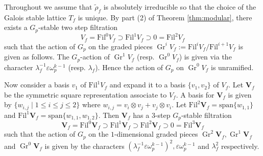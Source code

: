 \documentclass{amsart}
\renewcommand{\leq}{\leqslant}
\newcommand{\Fil}{\mathrm{Fil}}
\newcommand{\bV}{\mathbf{V}}
\DeclareMathOperator{\Gr}{Gr}
\newtheorem{auxiliary proposition}[theorem]{Auxiliary Proposition}
\newtheorem{main conjecture}[theorem]{Main Conjecture}
\newtheorem{main theorem}[theorem]{Main Theorem}
\newtheorem{modesty proposition}[theorem]{Modesty Proposition}
\newtheorem{open problem}[theorem]{Open Problem}
\newtheorem{convergence lemma}[theorem]{Convergence Lemma}
\newtheorem{corrected lemma}[theorem]{Corrected Lemma}
\newtheorem{growth lemma}[theorem]{Growth Lemma}
\newtheorem{coefficient lemma}[theorem]{Integrality Lemma}
\newtheorem{interpolation lemma}[theorem]{Interpolation Lemma}
\newtheorem{kernel lemma}[theorem]{Kernel Lemma}
\newtheorem{limit lemma}[theorem]{Limit Lemma}
\newtheorem{tandem lemma}[theorem]{Modesty Lemma}
\newtheorem{zero-finding lemma}[theorem]{Zero-Finding Lemma}
\begin{document}
Throughout we assume that $\tilde{\rho}_f$ is absolutely irreducible so that the choice of the Galois stable lattice $T_f$ is unique.  By part (2) of Theorem \ref{thm:modular}, there exists a $G_p$-stable two step filtration 
$$V_f=\Fil^0V_f \supset \Fil^1V_f \supset 0=\Fil^2V_f$$
such that the action of $G_p$ on the graded pieces $\Gr^iV_f:=\Fil^iV_f/\Fil^{i+1}V_f$
is given as follows. The $G_p$-action of $\Gr^1V_f$ (resp. $\Gr^0V_f$) is given via the character $\lambda_f^{-1}\varepsilon \omega_p^{k-1}$ (resp. $\lambda_f$). Hence the action of $G_p$ on $\Gr^0V_f$ is unramified.

Now consider a basis $v_1$ of $\Fil^1V_f$ and expand it to a basis  $\{v_1,v_2\}$ of $V_f$. Let $\bV_f$ be the symmetric square representation associate to $V_f$. A basis for $\bV_f$ is given by $\{w_{i,j} \mid 1 \leq i \leq j \leq 2\}$ where $w_{i,j}=v_i \otimes v_j + v_j \otimes v_i$. Let $\Fil^2\bV_f=\mathrm{span}\{w_{1,1}\}$ and $\Fil^1\bV_f=\mathrm{span}\{w_{1,1},w_{1,2}\}$. Then $\bV_f$ has a $3$-step $G_p$-stable filtration 
$$\bV_f=\Fil^0\bV_f \supset \Fil^1\bV_f \supset \Fil^2\bV_f \supset 0=\Fil^3\bV_f$$
such that the action of $G_p$ on the $1$-dimensional graded pieces $\Gr^2 \bV_f, \Gr^1 \bV_f$ and $\Gr^0 \bV_f$ is given by the characters $(\lambda_f^{-1}\varepsilon \omega_p^{k-1})^2,\varepsilon \omega_p^{k-1}$ and $\lambda_f^2$ respectively. 
\end{document}
